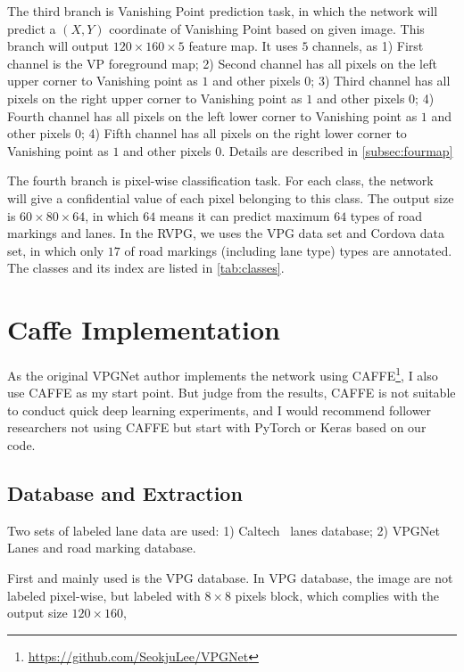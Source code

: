 \begin{spacing}{1.5}
The third branch is Vanishing Point prediction task, in which the network will predict a $(X,Y)$ coordinate of Vanishing Point based on given image. This branch will output $120 \times 160 \times 5$ feature map. It uses $5$ channels, as 1) First channel is the VP foreground map; 2) Second channel has all pixels on the left upper corner to Vanishing point as $1$ and other pixels $0$; 3) Third channel has all pixels on the right upper corner to Vanishing point as $1$ and other pixels $0$; 4) Fourth channel has all pixels on the left lower corner to Vanishing point as $1$ and other pixels $0$; 4) Fifth channel has all pixels on the right lower corner to Vanishing point as $1$ and other pixels $0$. Details are described in \autoref{subsec:fourmap}

The fourth branch is pixel-wise classification task. For each class, the network will give a confidential value of each pixel belonging to this class. The output size is $60 \times 80 \times 64$, in which $64$ means it can predict maximum $64$ types of road markings and lanes. In the RVPG, we uses the VPG data set and Cordova data set, in which only $17$ of road markings (including lane type) types are annotated. The classes and its index are listed in \autoref{tab:classes}.

\section{Caffe Implementation}
\label{sec:MD_CAFFE}

As the original VPGNet author implements the network using CAFFE\footnote{\url{https://github.com/SeokjuLee/VPGNet}}, I also use CAFFE as my start point. But judge from the results, CAFFE is not suitable to conduct quick deep learning experiments, and I would recommend follower researchers not using CAFFE but start with PyTorch or Keras based on our code.


\subsection{Database and Extraction}

Two sets of labeled lane data are used: 1) Caltech~\cite{caltech} lanes database; 2) VPGNet~\cite{lee2017vpgnet} Lanes and road marking database. 

First and mainly used is the VPG database. In VPG database, the image are not labeled pixel-wise, but labeled with $8 \times 8$ pixels block, which complies with the output size $120 \times 160$, 


\end{spacing}

